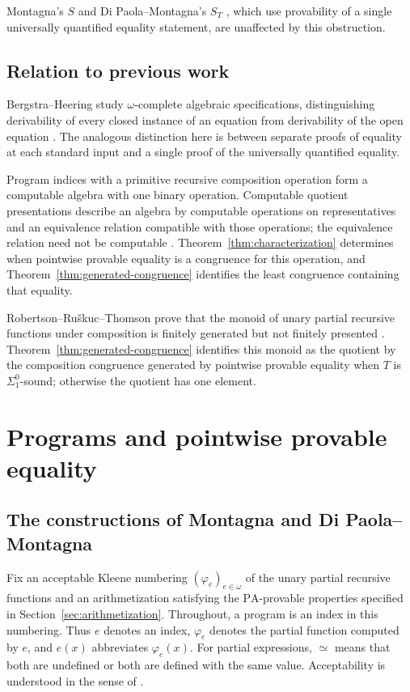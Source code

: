 \documentclass[11pt]{article}
\newcommand{\PA}{\mathrm{PA}}
\begin{document}
Montagna's $S$ \cite[p.~105]{Montagna} and Di Paola--Montagna's $S_T$
\cite[p.~646]{DiPaolaMontagna}, which use provability of a single
universally quantified equality statement, are unaffected by this obstruction.

\subsection{Relation to previous work}

Bergstra--Heering study $\omega$-complete algebraic specifications,
distinguishing derivability of every closed instance of an equation
from derivability of the open equation
\cite[Sections~1.2--1.3, pp.~150--152]{BergstraHeering}.
The analogous distinction here is between separate proofs of equality
at each standard input and a single proof of the universally quantified
equality.

Program indices with a primitive recursive composition operation form
a computable algebra with one binary operation. Computable quotient
presentations describe an algebra by computable operations on
representatives and an equivalence relation compatible with those
operations; the equivalence relation need not be computable
\cite[p.~9]{GodziszewskiHamkins}.
Theorem~\ref{thm:characterization} determines when pointwise provable
equality is a congruence for this operation, and
Theorem~\ref{thm:generated-congruence} identifies the least congruence
containing that equality.

Robertson--Ru\v{s}kuc--Thomson prove that the monoid of unary partial
recursive functions under composition is finitely generated but not
finitely presented
\cite[Theorems~2.2--2.3, pp.~168--169]{RobertsonRuskucThomson}.
Theorem~\ref{thm:generated-congruence} identifies this monoid as the
quotient by the composition congruence generated by pointwise provable
equality when $T$ is $\Sigma^0_1$-sound; otherwise the quotient has one
element.

\section{Programs and pointwise provable equality}\label{sec:programs}

\subsection{The constructions of Montagna and Di Paola--Montagna}

Fix an acceptable Kleene numbering $(\varphi_e)_{e\in\omega}$ of the unary
partial recursive functions and an arithmetization satisfying the
$\PA$-provable properties specified in
Section~\ref{sec:arithmetization}.
Throughout, a program is an index in this
numbering. Thus $e$ denotes an index, $\varphi_e$ denotes the partial function
computed by $e$, and $e(x)$ abbreviates $\varphi_e(x)$.
For partial expressions, $\simeq$ means that both are undefined or
both are defined with the same value.
Acceptability is understood
in the sense of \cite[Definitions~II.5.1--II.5.2, p.~215]{Odifreddi}.
\end{document}
